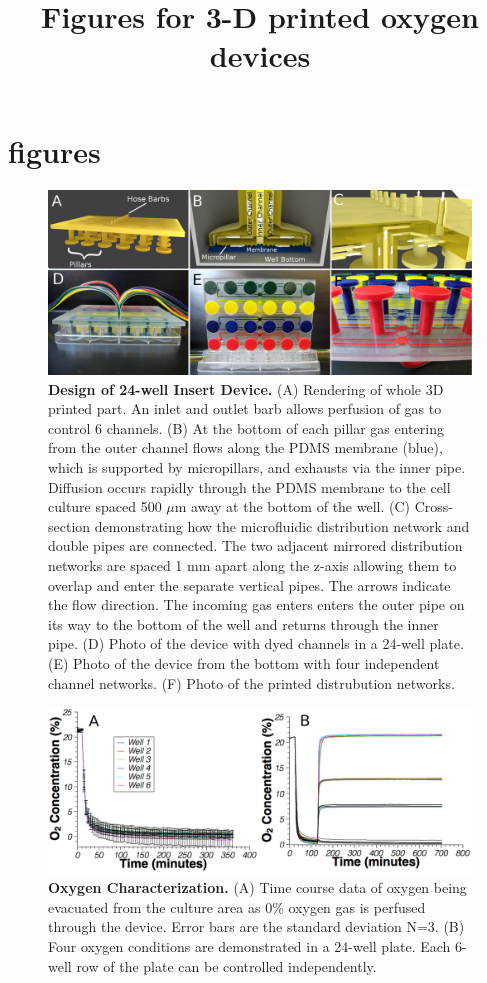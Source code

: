 \documentclass[]{article}
\title{Figures for  3-D printed oxygen devices}
\author{}
\begin{document}

\section{figures}

\begin{figure}[H]
\includegraphics[scale=.75]{fig1.png} 
\caption{
{\bf Design of 24-well Insert Device.}
(A) Rendering of whole 3D printed part.
An inlet and outlet barb allows perfusion of gas to control 6 channels.
(B) At the bottom of each pillar gas entering from the outer channel flows along the PDMS membrane (blue), which is supported by micropillars, and exhausts via the inner pipe.
Diffusion occurs rapidly through the PDMS membrane to the cell culture spaced 500 $\mu$m away at the bottom of the well.
(C) Cross-section demonstrating how the microfluidic distribution network and double pipes are connected. 
The two adjacent mirrored distribution networks are spaced 1 mm apart along the z-axis allowing them to overlap and enter the separate vertical pipes.
The arrows indicate the flow direction.
The incoming gas enters enters the outer pipe on its way to the bottom of the well and returns through the inner pipe.
(D) Photo of the device with dyed channels in a 24-well plate.
(E) Photo of the device from the bottom with four independent channel networks.
(F) Photo of the printed distrubution networks.
}
\label{figure1}
\end{figure}

\begin{figure}[H]
\includegraphics[scale=0.15]{fig2.png}
\caption{
{\bf Oxygen Characterization.} 
(A) Time course data of oxygen being evacuated from the culture area as 0\% oxygen gas is perfused through the device.
Error bars are the standard deviation N=3.
(B) Four oxygen conditions are demonstrated in a 24-well plate.
Each 6-well row of the plate can be controlled independently.  
}
\label{figure2}
\end{figure}
\end{document}
